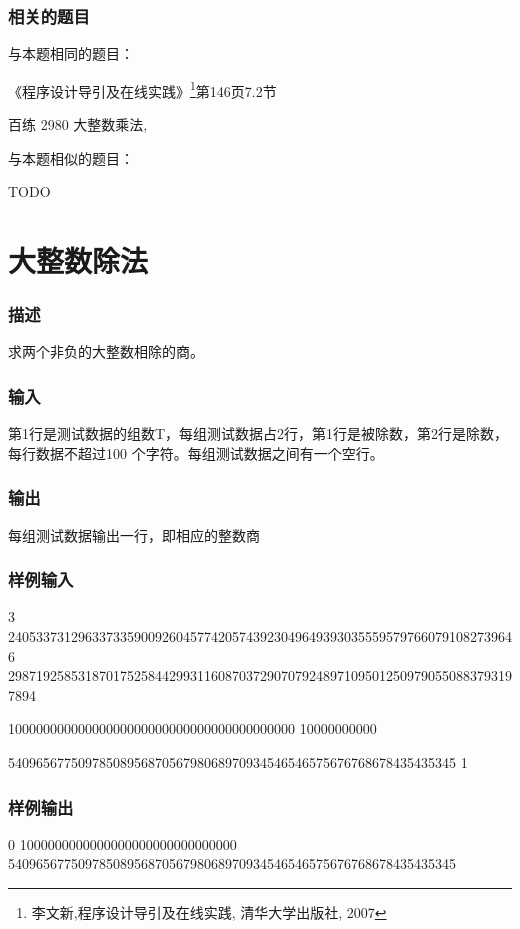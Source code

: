 \subsubsection{相关的题目}
与本题相同的题目：
\begindot
\item 《程序设计导引及在线实践》\footnote{李文新,程序设计导引及在线实践, 清华大学出版社, 2007}第146页7.2节
\item 百练 2980 大整数乘法, 
\myenddot

与本题相似的题目：
\begindot
\item  TODO
\myenddot


\section{大整数除法} %
\subsubsection{描述}
求两个非负的大整数相除的商。

\subsubsection{输入}
第1行是测试数据的组数T，每组测试数据占2行，第1行是被除数，第2行是除数，每行数据不超过100 个字符。每组测试数据之间有一个空行。

\subsubsection{输出}
每组测试数据输出一行，即相应的整数商

\subsubsection{样例输入}
\begin{Code}
3
2405337312963373359009260457742057439230496493930355595797660791082739646
2987192585318701752584429931160870372907079248971095012509790550883793197894

10000000000000000000000000000000000000000
10000000000

5409656775097850895687056798068970934546546575676768678435435345
1
\end{Code}

\subsubsection{样例输出}
\begin{Code}
0
1000000000000000000000000000000
5409656775097850895687056798068970934546546575676768678435435345
\end{Code}


